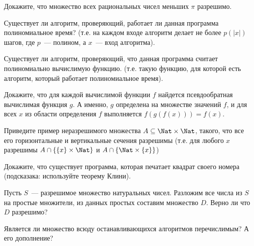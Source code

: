 \setcounter{curtask}{9}


\begin{task}
    Докажите, что множество всех рациональных чисел меньших $\pi$ разрешимо.
\end{task}

\begin{task}
    Существует ли алгоритм, проверяющий, работает ли данная программа
    полиномиальное время? (т.е. на каждом входе алгоритм делает не более $p(|x|)$
    шагов, где $p$~--- полином, а $x$~--- вход алгоритма).
\end{task}

\begin{task}
    Существует ли алгоритм, проверяющий, что данная программа считает полиномиально
    вычислимую функцию. (т.е. такую функцию, для которой есть алгоритм, который
    работает полиномиальное время).
\end{task}

\begin{task}
    Докажите, что для каждой вычислимой функции $f$ найдется
    псевдообратная вычислимая функция $g$. А именно, $g$ определена на
    множестве значений $f$, и для всех $x$ из области определения $f$
    выполняется $f(g(f(x))) = f(x)$.
\end{task}

\begin{task}
    Приведите пример неразрешимого множества $A \subseteq \Nat \times \Nat$,
    такого, что все его горизонтальные и вертикальные сечения
    разрешимы (т.е. для любого $x$ разрешимы $A \cap \{\{x\} \times \Nat\}$
    и $A \cap \{\Nat \times \{x\}\}$)
\end{task}


\begin{task}
    Докажите, что существует программа, которая печатает квадрат
    своего номера (подсказака: используйте теорему Клини).
\end{task}

\begin{task}
    Пусть $S$~--- разрешимое множество натуральных чисел. Разложим все
    числа из $S$ на простые множители, из данных простых составим
    множество $D$. Верно ли что $D$ разрешимо?
\end{task}



\breakline


\begin{ptask}{6}
    Является ли множество всюду останавливающихся алгоритмов перечислимым? А его
    дополнение?
\end{ptask}

